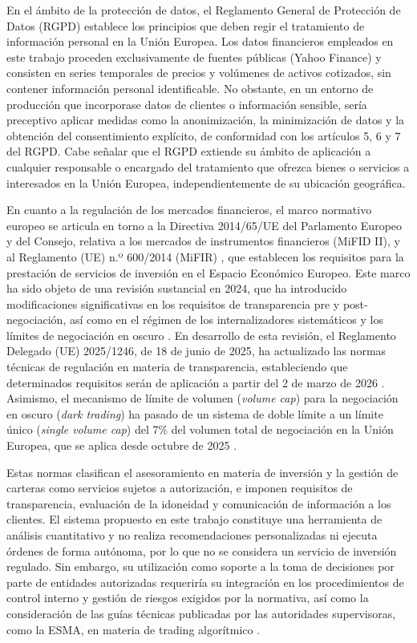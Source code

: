 \documentclass[
]{article}
\begin{document}
En el ámbito de la protección de datos, el Reglamento General de Protección de Datos (RGPD) \parencite{UE2016} establece los principios que deben regir el tratamiento de información personal en la Unión Europea. Los datos financieros empleados en este trabajo proceden exclusivamente de fuentes públicas (Yahoo Finance) y consisten en series temporales de precios y volúmenes de activos cotizados, sin contener información personal identificable. No obstante, en un entorno de producción que incorporase datos de clientes o información sensible, sería preceptivo aplicar medidas como la anonimización, la minimización de datos y la obtención del consentimiento explícito, de conformidad con los artículos 5, 6 y 7 del RGPD. Cabe señalar que el RGPD extiende su ámbito de aplicación a cualquier responsable o encargado del tratamiento que ofrezca bienes o servicios a interesados en la Unión Europea, independientemente de su ubicación geográfica.

En cuanto a la regulación de los mercados financieros, el marco normativo europeo se articula en torno a la Directiva 2014/65/UE del Parlamento Europeo y del Consejo, relativa a los mercados de instrumentos financieros (MiFID II), y al Reglamento (UE) n.º 600/2014 (MiFIR) \parencite{UE2014}, que establecen los requisitos para la prestación de servicios de inversión en el Espacio Económico Europeo. Este marco ha sido objeto de una revisión sustancial en 2024, que ha introducido modificaciones significativas en los requisitos de transparencia pre y post-negociación, así como en el régimen de los internalizadores sistemáticos y los límites de negociación en oscuro \parencite{UE2024}. En desarrollo de esta revisión, el Reglamento Delegado (UE) 2025/1246, de 18 de junio de 2025, ha actualizado las normas técnicas de regulación en materia de transparencia, estableciendo que determinados requisitos serán de aplicación a partir del 2 de marzo de 2026 \parencite{UE2025}. Asimismo, el mecanismo de límite de volumen (\textit{volume cap}) para la negociación en oscuro (\textit{dark trading}) ha pasado de un sistema de doble límite a un límite único (\textit{single volume cap}) del 7\% del volumen total de negociación en la Unión Europea, que se aplica desde octubre de 2025 \parencite{ESMA2025a}.

Estas normas clasifican el asesoramiento en materia de inversión y la gestión de carteras como servicios sujetos a autorización, e imponen requisitos de transparencia, evaluación de la idoneidad y comunicación de información a los clientes. El sistema propuesto en este trabajo constituye una herramienta de análisis cuantitativo y no realiza recomendaciones personalizadas ni ejecuta órdenes de forma autónoma, por lo que no se considera un servicio de inversión regulado. Sin embargo, su utilización como soporte a la toma de decisiones por parte de entidades autorizadas requeriría su integración en los procedimientos de control interno y gestión de riesgos exigidos por la normativa, así como la consideración de las guías técnicas publicadas por las autoridades supervisoras, como la ESMA, en materia de trading algorítmico \parencite{ESMA2026}.
\end{document}
